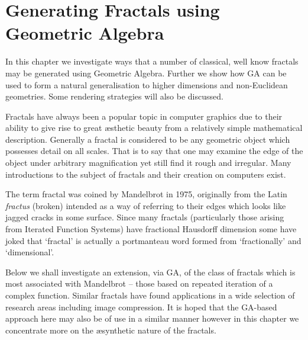 \begin{savequote}
\end{savequote}

\chapter{Generating Fractals using Geometric Algebra}
\label{chap:fractals}

In this chapter we investigate ways that a number of classical, well know
fractals may be generated using Geometric Algebra. Further we show how
GA can be used to form a natural generalisation to higher dimensions and
non-Euclidean geometries. Some rendering strategies will also be discussed.

Fractals have always been a popular topic in computer graphics due to their
ability to give rise to great \ae sthetic beauty from a relatively simple
mathematical description. Generally a fractal is considered to be any
geometric object which possesses detail on all
scales\cite{FRAC:FractalsEverywhere, FRAC:FractalGeometryOfNature}. That is to
say that one may examine the edge of the object under arbitrary magnification
yet still find it rough and irregular. Many introductions to the subject of
fractals and their creation on computers exist\cite{FRAC:FractalGeometry,
  FRAC:ChaosAndFractals, FRAC:FractalImages}.

The term fractal was coined by Mandelbrot\cite{FRAC:LesObjetsFractals} in 1975,
originally from the Latin {\em fractus} (broken) intended as a way of referring
to their edges which looks like jagged cracks in some surface. Since many
fractals (particularly those arising from Iterated Function Systems) have
fractional Hausdorff dimension\cite{FRAC:GeometryOfFractalSets}
some have joked that `fractal' is actually a portmanteau word formed from
`fractionally' and `dimensional'.

Below we shall investigate an extension, via GA, of the class of fractals 
which is most associated with Mandelbrot -- those based on repeated iteration
of a complex function.  Similar fractals have found applications in a wide
selection of research areas including image 
compression\cite{Barnsley88c,Barnsley93b}.%
It is hoped that the GA-based approach here may
also be of use in a similar manner however in this chapter we concentrate more
on the \ae synthetic nature of the fractals.

